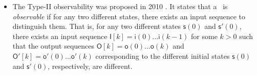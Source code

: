 \begin{itemize}
\item The  {\sf Type-II} observability was proposed in 2010 \cite{Zhao2010Input}. It states that a \BCN\  is {\em observable} if for any two different states, there exists an input sequence  to  distinguish them. That is,  for any two different states $\mathsf{s}(0)$ and $\mathsf{s}'(0)$, there exists an input sequence  $\mathsf{I}[k]=\mathsf{i}(0)\ldots\mathsf{i}(k-1)$ for some $k>0$ such that the output sequences $\mathsf{O}[k]=\mathsf{o}(0)\ldots\mathsf{o}(k)$ and  $\mathsf{O}'[k]=\mathsf{o}'(0)\ldots\mathsf{o}'(k)$ corresponding to  the different initial states  $\mathsf{s}(0)$ and $\mathsf{s}'(0)$, respectively, are different.
	
	

\end{itemize}
